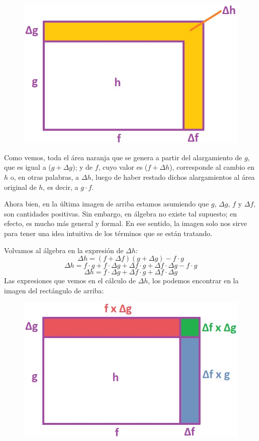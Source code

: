 \documentclass[12pt]{article}
\begin{document}
\begin{figure}[hbt!]
\centering
\includegraphics[scale=0.6]{img/formal_prod_rule.jpg}
\end{figure}

Como vemos, toda el área naranja que se genera a partir del alargamiento de $g$, que es igual a ($g + \Delta g$); y de $f$, cuyo valor es ($f + \Delta h$), corresponde al cambio en $h$ o, en otras palabras, a $\Delta h$, luego de haber restado dichos alargamientos al área original de $h$, es decir, a $g \cdot f$.

Ahora bien, en la última imagen de arriba estamos asumiendo que $g$, $\Delta g$, $f$ y $\Delta f$, son cantidades positivas. Sin embargo, en álgebra no existe tal supuesto; en efecto, es mucho más general y formal. En ese sentido, la imagen solo nos sirve para tener una idea intuitiva de los términos que se están tratando.

Volvamos al álgebra en la expresión de $\Delta h$:
\[\Delta h = (f + \Delta f)(g + \Delta g) - f \cdot g\]
\[\Delta h = f \cdot g + f \cdot \Delta g + \Delta f \cdot g + \Delta f \cdot \Delta g - f \cdot g\]
\[\Delta h = f \cdot \Delta g + \Delta f \cdot g + \Delta f \cdot \Delta g\]
Las expresiones que vemos en el cálculo de $\Delta h$, los podemos encontrar en la imagen del rectángulo de arriba:

\newpage

\begin{figure}[hbt!]
\centering
\includegraphics[scale=0.6]{img/formal_prod_rule_2.jpg}
\end{figure}
\end{document}
